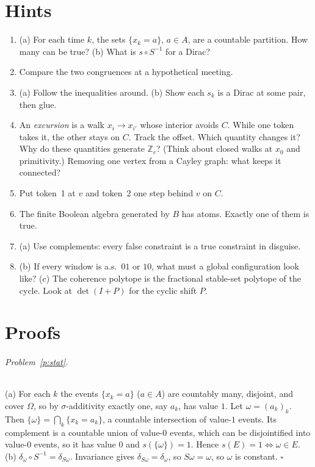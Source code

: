 \documentclass[11pt]{article}
\theoremstyle{definition}
\theoremstyle{remark}
\newcommand{\bbZ}{\mathbb{Z}}
\begin{document}
\newpage
\part{Hints}

\begin{enumerate}[label=\textbf{\arabic*.}]
\item (a) For each time $k$, the sets $\{x_k=a\}$, $a\in A$, are a countable
  partition. How many can be true? (b) What is $s\circ S^{-1}$ for a Dirac?
\item Compare the two congruences at a hypothetical meeting.
\item (a) Follow the inequalities around. (b) Show each $s_k$ is a Dirac at some
  pair, then glue.
\item An \emph{excursion} is a walk $x_i\to x_{i'}$ whose interior avoids $C$.
  While one token takes it, the other stays on $C$. Track the offset. Which
  quantity changes it? Why do these quantities generate $\bbZ_c$? (Think about
  closed walks at $x_0$ and primitivity.) Removing one vertex from a Cayley graph:
  what keeps it connected?
\item Put token~1 at $v$ and token~2 one step behind $v$ on $C$.
\item The finite Boolean algebra generated by $B$ has atoms. Exactly one of them
  is true.
\item (a) Use complements: every false constraint is a true constraint in disguise.
\item (b) If every window is a.s.\ $01$ or $10$, what must a global configuration
  look like? (c) The coherence polytope is the fractional stable-set polytope of
  the cycle. Look at $\det(I+P)$ for the cyclic shift $P$.
\end{enumerate}

\newpage
\part{Proofs}

\paragraph{Problem~\ref{p:stat}.}
(a) For each $k$ the events $\{x_k=a\}$ ($a\in A$) are countably many, disjoint,
and cover $\Omega$, so by $\sigma$-additivity exactly one, say $a_k$, has value
$1$. Let $\omega=(a_k)_k$. Then $\{\omega\}=\bigcap_k\{x_k=a_k\}$, a countable
intersection of value-$1$ events. Its complement is a countable union of
value-$0$ events, which can be disjointified into value-$0$ events, so it has
value $0$ and $s(\{\omega\})=1$. Hence $s(E)=1\iff\omega\in E$.
(b) $\delta_\omega\circ S^{-1}=\delta_{S\omega}$. Invariance gives
$\delta_{S\omega}=\delta_\omega$, so $S\omega=\omega$, so $\omega$ is constant.
\hfill$\square$
\end{document}
